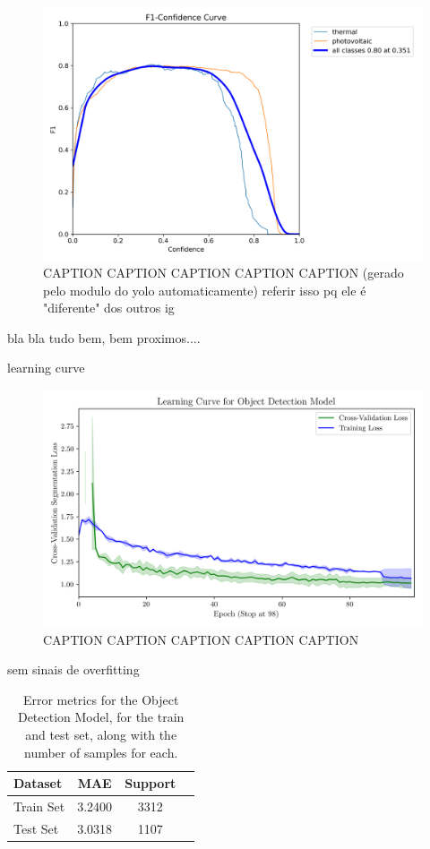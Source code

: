 \documentclass[conference]{IEEEtran}
\begin{document}
\begin{figure}[H]
    \centering
    \includegraphics[width=1\linewidth]{assets/model03_yolof1.png}
    \caption{CAPTION CAPTION CAPTION CAPTION CAPTION (gerado pelo modulo do yolo automaticamente) referir isso pq ele é "diferente" dos outros ig}
    \label{fig:model03_yolof1}
\end{figure}

bla bla tudo bem, bem proximos....

learning curve

\begin{figure}[H]
    \centering
    \includegraphics[width=1\linewidth]{assets/model03_lc.png}
    \caption{CAPTION CAPTION CAPTION CAPTION CAPTION}
    \label{fig:model03_lc}
\end{figure}

sem sinais de overfitting

\begin{table}[H]
\centering
\caption{Error metrics for the Object Detection Model, for the train and test set, along with the number of samples for each.}
\label{tab:model03_results}
\begin{tabular}{lccc}
\toprule
\textbf{Dataset} & \textbf{MAE} & \textbf{Support} \\
\midrule
Train Set & 3.2400 & 3312 \\
Test Set & 3.0318 & 1107 \\
\bottomrule
\end{tabular}
\end{table}
\end{document}
